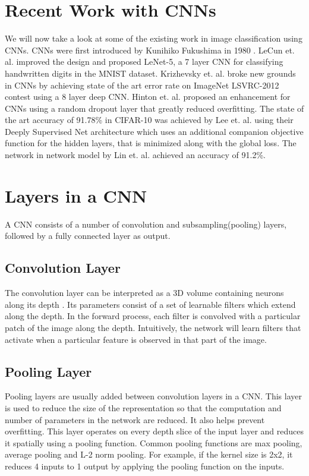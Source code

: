 \documentclass[10pt,twocolumn,letterpaper]{article}
\begin{document}
\section{Recent Work with CNNs}
We will now take a look at some of the existing work in image classification using CNNs. CNNs were first introduced by Kunihiko Fukushima in 1980 \cite{fukushima1980neocognitron}. LeCun et. al. \cite{lecun1998gradient} improved the design and proposed LeNet-5, a 7 layer CNN for classifying handwritten digits in the MNIST dataset. Krizhevsky et. al. \cite{krizhevsky2012imagenet} broke new grounds in CNNs by achieving state of the art error rate on ImageNet LSVRC-2012 contest using a 8 layer deep CNN. Hinton et. al. \cite{hinton2012improving} proposed an enhancement for CNNs using a random dropout layer that greatly reduced overfitting.
	The state of the art accuracy of 91.78\% in CIFAR-10 was achieved by Lee et. al. \cite{lee2014deeply} using their Deeply Supervised Net architecture which uses an additional companion objective function for the hidden layers, that is minimized along with the global loss. The network in network model by Lin et. al. \cite{DBLP:journals/corr/LinCY13} achieved an accuracy of 91.2\%.


\section{Layers in a CNN}
A CNN consists of a number of convolution and subsampling(pooling) layers, followed by a fully connected layer as output. 
\subsection{Convolution Layer}
The convolution layer can be interpreted as a 3D volume containing neurons along its depth \cite{cnnref}. Its parameters consist of a set of learnable filters which extend along the depth. In the forward process, each filter is convolved with a particular patch of the image along the depth. Intuitively, the network will learn filters that activate when a particular feature is observed in that part of the image.

\subsection{Pooling Layer}
Pooling layers are usually added between convolution layers in a CNN. This layer is used to reduce the size of the representation so that the computation and number of parameters in the network are reduced. It also helps prevent overfitting. This layer operates on every depth slice of the input layer and reduces it spatially using a pooling function. Common pooling functions are max  pooling, average pooling and L-2 norm pooling. For example, if the kernel size is 2x2, it reduces 4 inputs to 1 output by applying the pooling function on the inputs.
\end{document}
